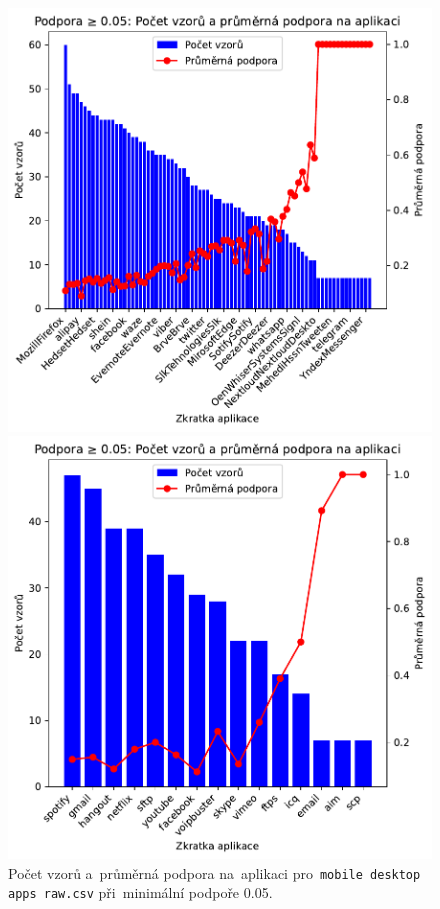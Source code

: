 \begin{figure}[H]
    \centering
    \begin{minipage}[t]{0.49\textwidth}
        \centering
    \includegraphics[width=\linewidth]{obrazky-figures/exps/patterns_support_0.05_mobile.pdf}
    \caption{Počet vzorů a~průměrná podpora na~aplikaci pro~\texttt{mobile desktop apps raw.csv} při~minimální podpoře 0.05.}
    \label{fig:appendix-}
    \end{minipage}%
    \hfill
    \begin{minipage}[t]{0.49\textwidth}
       \centering
        \includegraphics[width=\linewidth]{obrazky-figures/exps/patterns_support_0.05_iscx.pdf}

\end{minipage}
\end{figure}

